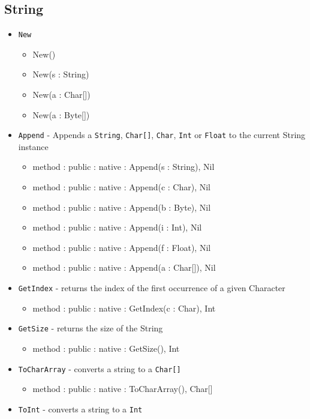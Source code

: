 \documentclass[12pt]{article}
\begin{document}
\subsection{String}
\begin{itemize}
    \item \texttt{New} 
    	\begin{itemize}
	\item New()
	\item New(s : String)
	\item New(a : Char[])
	\item New(a : Byte[])
	\end{itemize}
    \item \texttt{Append} - Appends a \texttt{String}, \texttt{Char[]}, \texttt{Char}, \texttt{Int} or \texttt{Float} to the current String instance
    	\begin{itemize}
	\item method : public : native : Append(s : String), Nil
	\item method : public : native : Append(c : Char), Nil
	\item method : public : native : Append(b : Byte), Nil
	\item method : public : native : Append(i : Int), Nil
	\item method : public : native : Append(f : Float), Nil
	\item method : public : native : Append(a : Char[]), Nil
	\end{itemize}
    \item \texttt{GetIndex} - returns the index of the first occurrence of a given Character
    	\begin{itemize}
	\item method : public : native : GetIndex(c : Char), Int
	\end{itemize}
    \item \texttt{GetSize} - returns the size of the String
    	\begin{itemize}
	\item method : public : native : GetSize(), Int
	\end{itemize}
    \item \texttt{ToCharArray} - converts a string to a \texttt{Char[]}
    	\begin{itemize}
	\item method : public : native : ToCharArray(), Char[]
	\end{itemize}
    \item \texttt{ToInt} - converts a string to a \texttt{Int}

\end{itemize}
\end{document}
